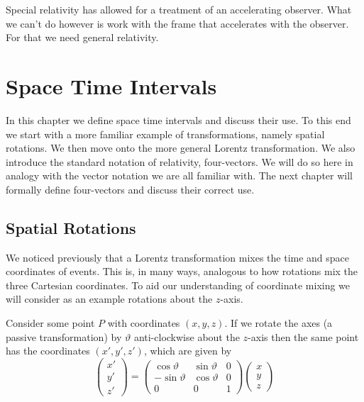 \documentclass[fleqn]{NotesClass}
\begin{document}
    Special relativity has allowed for a treatment of an accelerating observer.
    What we can't do however is work with the frame that accelerates with the observer.
    For that we need general relativity.
    
    \chapter{Space Time Intervals}
    In this chapter we define space time intervals and discuss their use.
    To this end we start with a more familiar example of transformations, namely spatial rotations.
    We then move onto the more general Lorentz transformation.
    We also introduce the standard notation of relativity, four-vectors.
    We will do so here in analogy with the vector notation we are all familiar with.
    The next chapter will formally define four-vectors and discuss their correct use.
    
    \section{Spatial Rotations}\label{sec:spatial rotations}
    We noticed previously that a Lorentz transformation mixes the time and space coordinates of events.
    This is, in many ways, analogous to how rotations mix the three Cartesian coordinates.
    To aid our understanding of coordinate mixing we will consider as an example rotations about the \(z\)-axis.
    
    Consider some point \(P\) with coordinates \((x, y, z)\).
    If we rotate the axes (a passive transformation) by \(\vartheta\) anti-clockwise about the \(z\)-axis then the same point has the coordinates \((x', y', z')\), which are given by
    \begin{equation}
        \begin{pmatrix}
            x'\\ y'\\ z'
        \end{pmatrix}
        =
        \begin{pmatrix}
            \cos\vartheta & \sin\vartheta & 0\\
            -\sin\vartheta & \cos\vartheta & 0\\
            0 & 0 & 1
        \end{pmatrix}
        \begin{pmatrix}
            x\\ y\\ z
        \end{pmatrix}
    \end{equation}
    
\end{document}

